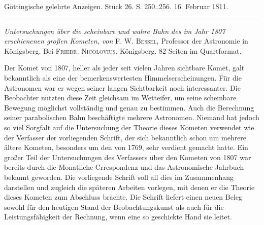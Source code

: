 \hypertarget{native-535lower}{}\label{native-535lower}
\begin{center}\small Göttingische gelehrte Anzeigen. Stück 26. S. 250..256. 16. Februar 1811.\\[3pt]\rule{.72\linewidth}{.3pt}\end{center}

\emph{Untersuchungen über die scheinbare und wahre Bahn des im Jahr \textup{1807} erschienenen großen Kometen, von} F. W. \textsc{Bessel}, Professor der Astronomie in Königsberg. Bei \textsc{Friedr. Nicolovius}. Königsberg. 82 Seiten im Quartformat.

Der Komet von 1807, heller als jeder seit vielen Jahren sichtbare Komet, galt bekanntlich als eine der bemerkenswertesten Himmelserscheinungen. Für die Astronomen war er wegen seiner langen Sichtbarkeit noch interessanter. Die Beobachter nutzten diese Zeit gleichsam im Wetteifer, um seine scheinbare Bewegung möglichst vollständig und genau zu bestimmen. Auch die Berechnung seiner parabolischen Bahn beschäftigte mehrere Astronomen. Niemand hat jedoch so viel Sorgfalt auf die Untersuchung der Theorie dieses Kometen verwendet wie der Verfasser der vorliegenden Schrift, der sich bekanntlich schon um mehrere ältere Kometen, besonders um den von 1769, sehr verdient gemacht hatte. Ein großer Teil der Untersuchungen des Verfassers über den Kometen von 1807 war bereits durch die Monatliche Crrespondenz und das Astronomische Jahrbuch bekannt geworden. Die vorliegende Schrift soll all dies im Zusammenhang darstellen und zugleich die späteren Arbeiten vorlegen, mit denen er die Theorie dieses Kometen zum Abschluss brachte. Die Schrift liefert einen neuen Beleg sowohl für den heutigen Stand der Beobachtungskunst als auch für die Leistungsfähigkeit der Rechnung, wenn eine so geschickte Hand sie leitet.

